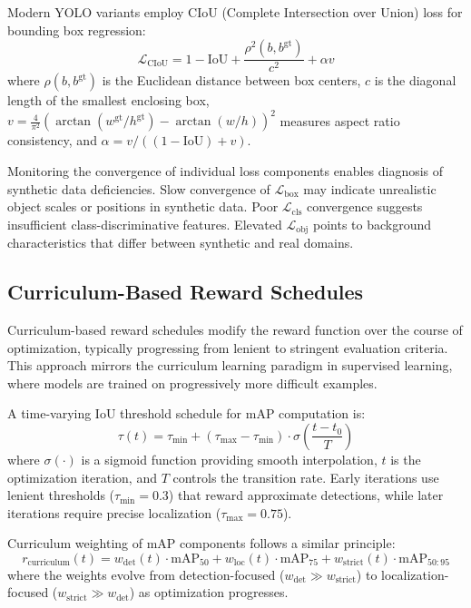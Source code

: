 Modern YOLO variants employ CIoU (Complete Intersection over Union) loss for bounding box regression:
\begin{equation}
\mathcal{L}_{\text{CIoU}} = 1 - \text{IoU} + \frac{\rho^2(b, b^{\text{gt}})}{c^2} + \alpha v
\label{eq:ciou_loss}
\end{equation}
where $\rho(b, b^{\text{gt}})$ is the Euclidean distance between box centers, $c$ is the diagonal length of the smallest enclosing box, $v = \frac{4}{\pi^2}(\arctan(w^{\text{gt}}/h^{\text{gt}}) - \arctan(w/h))^2$ measures aspect ratio consistency, and $\alpha = v / ((1 - \text{IoU}) + v)$.

Monitoring the convergence of individual loss components enables diagnosis of synthetic data deficiencies. Slow convergence of $\mathcal{L}_{\text{box}}$ may indicate unrealistic object scales or positions in synthetic data. Poor $\mathcal{L}_{\text{cls}}$ convergence suggests insufficient class-discriminative features. Elevated $\mathcal{L}_{\text{obj}}$ points to background characteristics that differ between synthetic and real domains.

\subsection{Curriculum-Based Reward Schedules}

Curriculum-based reward schedules modify the reward function over the course of optimization, typically progressing from lenient to stringent evaluation criteria. This approach mirrors the curriculum learning paradigm in supervised learning, where models are trained on progressively more difficult examples.

A time-varying IoU threshold schedule for mAP computation is:
\begin{equation}
\tau(t) = \tau_{\text{min}} + (\tau_{\text{max}} - \tau_{\text{min}}) \cdot \sigma\left(\frac{t - t_0}{T}\right)
\label{eq:curriculum_iou}
\end{equation}
where $\sigma(\cdot)$ is a sigmoid function providing smooth interpolation, $t$ is the optimization iteration, and $T$ controls the transition rate. Early iterations use lenient thresholds ($\tau_{\text{min}} = 0.3$) that reward approximate detections, while later iterations require precise localization ($\tau_{\text{max}} = 0.75$).

Curriculum weighting of mAP components follows a similar principle:
\begin{equation}
r_{\text{curriculum}}(t) = w_{\text{det}}(t) \cdot \text{mAP}_{50} + w_{\text{loc}}(t) \cdot \text{mAP}_{75} + w_{\text{strict}}(t) \cdot \text{mAP}_{50:95}
\label{eq:curriculum_weighting}
\end{equation}
where the weights evolve from detection-focused ($w_{\text{det}} \gg w_{\text{strict}}$) to localization-focused ($w_{\text{strict}} \gg w_{\text{det}}$) as optimization progresses.

